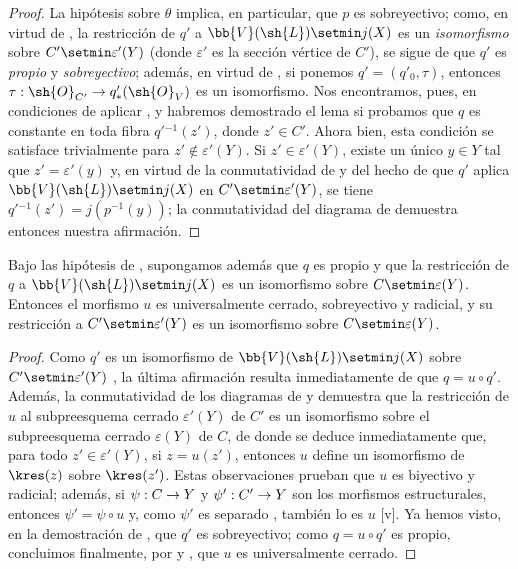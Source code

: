 \documentclass[oneside,10pt]{amsart}
\makeatletter
\newcommand{\ega@arrow}[2]{\mathchoice{#1}{#2}{#2}{#2}}
\renewcommand{\to}{\ega@arrow{\longrightarrow}{\rightarrow}}
\newcommand{\oldpage}[2][]{\marginnote{\normalfont\footnotesize\textbf{#1}~|~#2}\ignorespaces}
\let\EGAOriginalLabel\label
\renewcommand{\label}[1]{\phantomsection\EGAOriginalLabel{#1}}
\makeatother
\begin{document}
\begin{proof}
La hipótesis sobre $\theta$ implica, en particular, que $p$ es sobreyectivo;
como, en virtud de , la restricción de $q'$ a $\bb{V}(\sh{L})\setmin j(X)$ es un \emph{isomorfismo} sobre $C'\setmin\varepsilon'(Y)$ (donde $\varepsilon'$ es la sección vértice de $C'$), se sigue de  que $q'$ es \emph{propio} y \emph{sobreyectivo};
además, en virtud de , si ponemos $q'=(q'_0,\tau)$, entonces $\tau:\sh{O}_{C'}\to q'_*(\sh{O}_V)$ es un isomorfismo.
Nos encontramos, pues, en condiciones de aplicar , y habremos demostrado el lema si probamos que $q$ es constante en toda fibra $q'{}^{-1}(z')$, donde $z'\in C'$.
Ahora bien, esta condición se satisface trivialmente para $z'\notin\varepsilon'(Y)$.
Si $z'\in\varepsilon'(Y)$, existe un único $y\in Y$ tal que $z'=\varepsilon'(y)$ y, en virtud de la conmutatividad de  y del hecho de que $q'$ aplica $\bb{V}(\sh{L})\setmin j(X)$ en $C'\setmin\varepsilon'(Y)$, se tiene $q'{}^{-1}(z')=j(p^{-1}(y))$;
la conmutatividad del diagrama de  demuestra entonces nuestra afirmación.
\end{proof}

\begin{corollary}[8.11.6]
\label{II.8.11.6}
Bajo las hipótesis de , supongamos además que $q$ es propio y que la restricción de $q$ a $\bb{V}(\sh{L})\setmin j(X)$ es un isomorfismo sobre $C\setmin\varepsilon(Y)$.
Entonces el morfismo $u$ es universalmente cerrado, sobreyectivo y radicial, y su restricción a $C'\setmin\varepsilon'(Y)$ es un isomorfismo sobre $C\setmin\varepsilon(Y)$.
\end{corollary}

\begin{proof}
Como $q'$ es un isomorfismo de $\bb{V}(\sh{L})\setmin j(X)$ sobre $C'\setmin\varepsilon'(Y)$ , la última afirmación resulta inmediatamente de que $q=u\circ q'$.
Además, la conmutatividad de los diagramas
\oldpage[II]{191}
de  y  demuestra que la restricción de $u$ al subpreesquema cerrado $\varepsilon'(Y)$ de $C'$ es un isomorfismo sobre el subpreesquema cerrado $\varepsilon(Y)$ de $C$, de donde se deduce inmediatamente que, para todo $z'\in\varepsilon'(Y)$, si $z=u(z')$, entonces $u$ define un isomorfismo de $\kres(z)$ sobre $\kres(z')$.
Estas observaciones prueban que $u$ es biyectivo y radicial;
además, si $\psi:C\to Y$ y $\psi':C'\to Y$ son los morfismos estructurales, entonces $\psi'=\psi\circ u$ y, como $\psi'$ es separado , también lo es $u$ [v].
Ya hemos visto, en la demostración de , que $q'$ es sobreyectivo;
como $q=u\circ q'$ es propio, concluimos finalmente, por  y , que $u$ es universalmente cerrado.
\end{proof}
\end{document}
